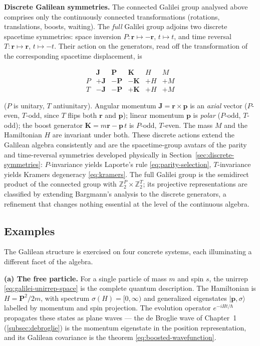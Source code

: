 \medskip\noindent\textbf{Discrete Galilean symmetries.} The connected Galilei group analysed above comprises only the continuously connected transformations (rotations, translations, boosts, waiting). The \emph{full} Galilei group adjoins two discrete spacetime symmetries: space inversion $P:\bm r\mapsto-\bm r$, $t\mapsto t$, and time reversal $T:\bm r\mapsto\bm r$, $t\mapsto-t$. Their action on the generators, read off the transformation of the corresponding spacetime displacement, is
\begin{linenomath}
\begin{equation}
\begin{array}{c|ccccc}
 & \bm J & \bm P & \bm K & H & M\\[2pt]\hline
P & +\bm J & -\bm P & -\bm K & +H & +M\\
T & -\bm J & -\bm P & +\bm K & +H & +M
\end{array}
\label{eq:discrete-galilean}
\end{equation}
\end{linenomath}
($P$ is unitary, $T$ antiunitary). Angular momentum $\bm J=\bm r\times\bm p$ is an \emph{axial} vector ($P$-even, $T$-odd, since $T$ flips both $\bm r$ and $\bm p$); linear momentum $\bm p$ is \emph{polar} ($P$-odd, $T$-odd); the boost generator $\bm K=m\bm r-\bm p\,t$ is $P$-odd, $T$-even. The mass $M$ and the Hamiltonian $H$ are invariant under both. These discrete actions extend the Galilean algebra consistently and are the spacetime-group avatars of the parity and time-reversal symmetries developed physically in Section~\ref{sec:discrete-symmetries}: $P$-invariance yields Laporte's rule \eqref{eq:parity-selection}, $T$-invariance yields Kramers degeneracy \eqref{eq:kramers}. The full Galilei group is the semidirect product of the connected group with $\mathbb Z_{2}^{P}\times\mathbb Z_{2}^{T}$; its projective representations are classified by extending Bargmann's analysis to the discrete generators, a refinement that changes nothing essential at the level of the continuous algebra.

\subsection{Examples}
\label{sec:galilei-examples}

The Galilean structure is exercised on four concrete systems, each illuminating a different facet of the algebra.

\medskip\noindent\textbf{(a) The free particle.} For a single particle of mass $m$ and spin $s$, the unirrep \eqref{eq:galilei-unirrep-space} is the complete quantum description. The Hamiltonian is $H = \bm P^{2}/2m$, with spectrum $\sigma(H) = [0,\infty)$ and generalized eigenstates $|\bm p,\sigma\rangle$ labelled by momentum and spin projection. The evolution operator $e^{-iHt/\hbar}$ propagates these states as plane waves --- the de Broglie wave of Chapter~1 (\eqref{subsec:debroglie}) is the momentum eigenstate in the position representation, and its Galilean covariance is the theorem \eqref{eq:boosted-wavefunction}.

